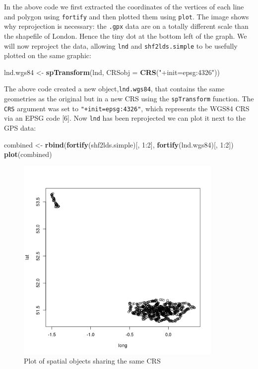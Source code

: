\documentclass[]{article}
\newenvironment{Shaded}{}{}
\newcommand{\KeywordTok}[1]{\textcolor[rgb]{0.00,0.44,0.13}{\textbf{{#1}}}}
\newcommand{\DataTypeTok}[1]{\textcolor[rgb]{0.56,0.13,0.00}{{#1}}}
\newcommand{\DecValTok}[1]{\textcolor[rgb]{0.25,0.63,0.44}{{#1}}}
\newcommand{\StringTok}[1]{\textcolor[rgb]{0.25,0.44,0.63}{{#1}}}
\newcommand{\NormalTok}[1]{{#1}}
\let\Oldincludegraphics\includegraphics
\renewcommand{\includegraphics}[1]{\Oldincludegraphics[width=10cm]{#1}}
\begin{document}
In the above code we first extracted the coordinates of the vertices of
each line and polygon using \texttt{fortify} and then plotted them using
\texttt{plot}. The image shows why reprojection is necessary: the
\texttt{.gpx} data are on a totally different scale than the shapefile
of London. Hence the tiny dot at the bottom left of the graph. We will
now reproject the data, allowing \texttt{lnd} and
\texttt{shf2lds.simple} to be usefully plotted on the same graphic:

\begin{Shaded}
\begin{Highlighting}[]
\NormalTok{lnd.wgs84 <- }\KeywordTok{spTransform}\NormalTok{(lnd, }\DataTypeTok{CRSobj =} \KeywordTok{CRS}\NormalTok{(}\StringTok{"+init=epsg:4326"}\NormalTok{))}
\end{Highlighting}
\end{Shaded}
The above code created a new object,\texttt{lnd.wgs84}, that contains
the same geometries as the original but in a new CRS using the
\texttt{spTransform} function. The \texttt{CRS} argument was set to
\texttt{"+init=epsg:4326"}, which represents the WGS84 CRS via an EPSG
code {[}6{]}. Now \texttt{lnd} has been reprojected we can plot it next
to the GPS data:

\begin{Shaded}
\begin{Highlighting}[]
\NormalTok{combined <- }\KeywordTok{rbind}\NormalTok{(}\KeywordTok{fortify}\NormalTok{(shf2lds.simple)[, }\DecValTok{1}\NormalTok{:}\DecValTok{2}\NormalTok{], }\KeywordTok{fortify}\NormalTok{(lnd.wgs84)[, }\DecValTok{1}\NormalTok{:}\DecValTok{2}\NormalTok{])}
\KeywordTok{plot}\NormalTok{(combined)}
\end{Highlighting}
\end{Shaded}
\begin{figure}[htbp]
\centering
\includegraphics{figure/Plot_of_spatial_objects_sharing_the_same_CRS.png}
\caption{Plot of spatial objects sharing the same CRS}
\end{figure}
\end{document}

